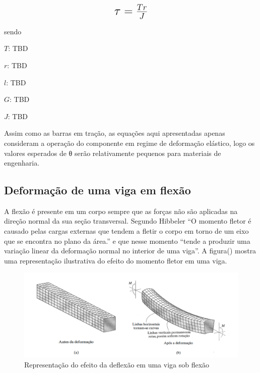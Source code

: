 \hfill

\begin{equation}\label{eq:Eq_190}%
\mbox{\fontsize{17.28}{21.6}\selectfont\( %
\tau = \frac{Tr}{J}
\)} %
\end{equation}

sendo

$T$: TBD

$r$: TBD

$l$: TBD

$G$: TBD

$J$: TBD

\hfill


Assim como as barras em tração, as equações aqui apresentadas apenas consideram a operação do componente em regime de deformação elástico, logo os valores esperados de θ serão relativamente pequenos para materiais de engenharia.

\subsection{Deformação de uma viga em flexão}

A flexão é presente em um corpo sempre que as forças não são aplicadas na direção normal da sua seção transversal. Segundo Hibbeler “O momento fletor é causado pelas cargas externas que tendem a fletir o corpo em torno de um eixo que se encontra no plano da área.” e que nesse momento “tende a produzir uma variação linear da deformação normal no interior de uma viga”.  A  figura() mostra uma representação ilustrativa do efeito do momento fletor em uma viga.

\begin{figure}[htb]
	\caption{\label{fig:1060} Representação do efeito da deflexão em uma viga sob flexão}
	\begin{center}
		\includegraphics[width=\textwidth]{pictures/1060.png}
	\end{center}
\end{figure}

